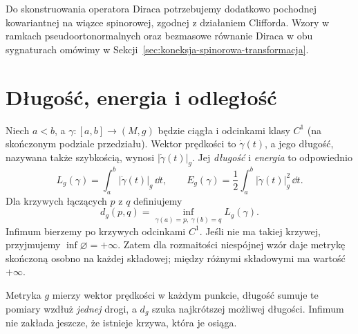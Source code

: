 \begin{uwaga}
Do skonstruowania operatora Diraca potrzebujemy
dodatkowo pochodnej kowariantnej na wiązce spinorowej,
zgodnej z działaniem Clifforda. Wzory w ramkach
pseudoortonormalnych oraz bezmasowe równanie Diraca
w obu sygnaturach omówimy w
Sekcji~\ref{sec:koneksja-spinorowa-transformacja}.
\end{uwaga}

\section{Długość, energia i odległość}
\label{sec:metryka-dlugosc-energia}

\begin{definicja}
\label{def:dlugosc-energia}
Niech $a<b$, a $\gamma:[a,b]\to(M,g)$ będzie ciągła
i odcinkami klasy $C^1$ (na skończonym podziale przedziału).
Wektor prędkości to $\dot\gamma(t)$, a jego długość,
nazywana także szybkością, wynosi $|\dot\gamma(t)|_g$.
Jej \emph{długość} i
\emph{energia} to odpowiednio
\begin{equation}\label{eq:dlugosc-energia}
 L_g(\gamma)=\int_a^b|\dot\gamma(t)|_g\,\dd t,
 \qquad
 E_g(\gamma)=\frac12\int_a^b
                  |\dot\gamma(t)|_g^2\,\dd t.
\end{equation}
Dla krzywych łączących $p$ z $q$ definiujemy
\begin{equation}\label{eq:odleglosc-riemannowska}
 d_g(p,q)=\inf_{\gamma(a)=p,\ \gamma(b)=q}
                 L_g(\gamma).
\end{equation}
Infimum bierzemy po krzywych odcinkami $C^1$.
Jeśli nie ma takiej krzywej, przyjmujemy $\inf\varnothing=+\infty$.
Zatem dla rozmaitości niespójnej wzór daje metrykę
skończoną osobno na każdej składowej; między różnymi
składowymi ma wartość $+\infty$.
\end{definicja}

Metryka $g$ mierzy wektor prędkości w każdym
punkcie, długość sumuje te pomiary wzdłuż
\emph{jednej} drogi, a $d_g$ szuka najkrótszej
możliwej długości. Infimum nie zakłada jeszcze,
że istnieje krzywa, która je osiąga.

